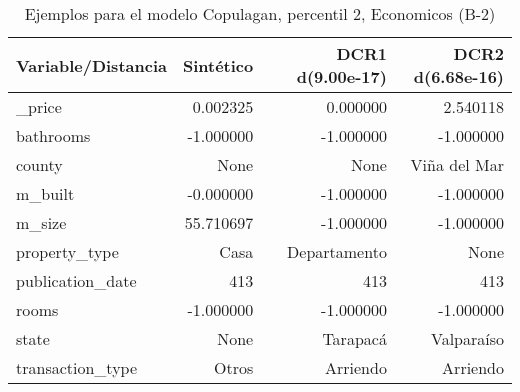\begin{table}[H]
\centering
\fontsize{10}{14}\selectfont
\caption{Ejemplos para el modelo Copulagan, percentil 2, Economicos (B-2)}
\label{table-example-economicos-b-2-copulagan-2p}
\begin{tabular}{|l|r|r|r|}
\hline
\rowcolor[gray]{0.8}
Variable/Distancia & Sintético & DCR1 d(9.00e-17) & DCR2 d(6.68e-16) \\
\hline \_price & \cellcolor[rgb]{0.9, 0.54, 0.52} 0.002325 & \cellcolor[rgb]{0.9, 0.54, 0.52} 0.000000 & 2.540118 \\
\hline bathrooms & \cellcolor[rgb]{0.9, 0.54, 0.52} -1.000000 & \cellcolor[rgb]{0.9, 0.54, 0.52} -1.000000 & \cellcolor[rgb]{0.9, 0.54, 0.52} -1.000000 \\
\hline county & \cellcolor[rgb]{0.9, 0.54, 0.52} None & \cellcolor[rgb]{0.9, 0.54, 0.52} None & Viña del Mar \\
\hline m\_built & \cellcolor[rgb]{0.9, 0.54, 0.52} -0.000000 & \cellcolor[rgb]{0.9, 0.54, 0.52} -1.000000 & \cellcolor[rgb]{0.9, 0.54, 0.52} -1.000000 \\
\hline m\_size & \cellcolor[rgb]{0.9, 0.54, 0.52} 55.710697 & -1.000000 & -1.000000 \\
\hline property\_type & \cellcolor[rgb]{0.9, 0.54, 0.52} Casa & Departamento & None \\
\hline publication\_date & \cellcolor[rgb]{0.9, 0.54, 0.52} 413 & \cellcolor[rgb]{0.9, 0.54, 0.52} 413 & \cellcolor[rgb]{0.9, 0.54, 0.52} 413 \\
\hline rooms & \cellcolor[rgb]{0.9, 0.54, 0.52} -1.000000 & \cellcolor[rgb]{0.9, 0.54, 0.52} -1.000000 & \cellcolor[rgb]{0.9, 0.54, 0.52} -1.000000 \\
\hline state & \cellcolor[rgb]{0.9, 0.54, 0.52} None & Tarapacá & Valparaíso \\
\hline transaction\_type & \cellcolor[rgb]{0.9, 0.54, 0.52} Otros & Arriendo & Arriendo \\
\hline
\end{tabular}
\end{table}
